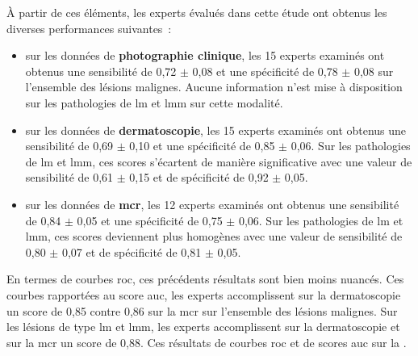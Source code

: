 À partir de ces éléments, les experts évalués dans cette étude ont obtenus les diverses performances suivantes~:
\begin{itemize}
    \item sur les données de \textbf{photographie clinique}, les 15 experts examinés ont obtenus une sensibilité de 0,72 $\pm$ 0,08 et une spécificité de 0,78 $\pm$ 0,08 sur l'ensemble des lésions malignes. Aucune information n'est mise à disposition sur les pathologies de \gls{lm} et \gls{lmm} sur cette modalité.
    \item sur les données de \textbf{dermatoscopie}, les 15 experts examinés ont obtenus une sensibilité de 0,69 $\pm$ 0,10 et une spécificité de 0,85 $\pm$ 0,06. Sur les pathologies de \gls{lm} et \gls{lmm}, ces scores s'écartent de manière significative avec une valeur de sensibilité de 0,61 $\pm$ 0,15 et de spécificité de 0,92 $\pm$ 0,05.
    \item sur les données de \textbf{\gls{mcr}}, les 12 experts examinés ont obtenus une sensibilité de 0,84 $\pm$ 0,05 et une spécificité de 0,75 $\pm$ 0,06. Sur les pathologies de \gls{lm} et \gls{lmm}, ces scores deviennent plus homogènes avec une valeur de sensibilité de 0,80 $\pm$ 0,07 et de spécificité de 0,81 $\pm$ 0,05.
\end{itemize}\par

En termes de courbes \gls{roc}, ces précédents résultats sont bien moins nuancés. Ces courbes rapportées au score \gls{auc}, les experts accomplissent sur la dermatoscopie un score de 0,85 contre 0,86 sur la \gls{mcr} sur l'ensemble des lésions malignes. Sur les lésions de type \gls{lm} et \gls{lmm}, les experts accomplissent sur la dermatoscopie et sur la \gls{mcr} un score de 0,88. Ces résultats de courbes \gls{roc} et de scores \gls{auc} sur la .\par

